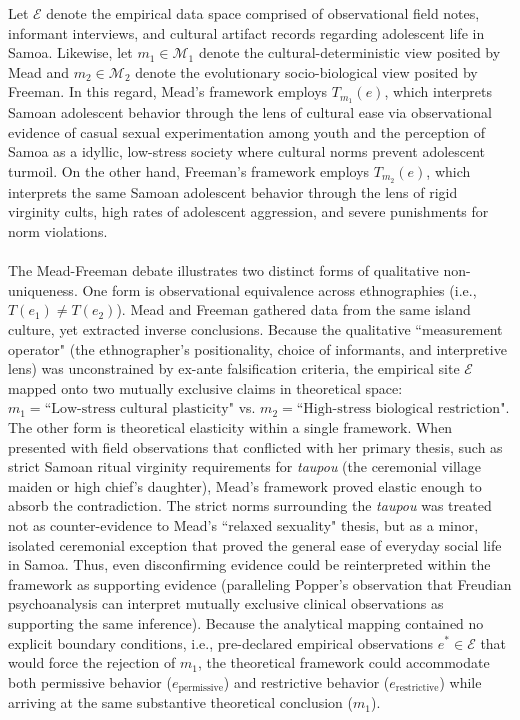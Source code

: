 \documentclass{article}
\theoremstyle{definition}
\begin{document}
Let $\mathcal{E}$ denote the empirical data space comprised of observational field notes, informant interviews, and cultural artifact records regarding adolescent life in Samoa. Likewise, let $m_1 \in \mathcal{M}_1$ denote the cultural-deterministic view posited by Mead and $m_2 \in \mathcal{M}_2$ denote the evolutionary socio-biological view posited by Freeman. In this regard, Mead's framework employs $T_{m_1}(e)$, which interprets Samoan adolescent behavior through the lens of cultural ease via observational evidence of casual sexual experimentation among youth and the perception of Samoa as a idyllic, low-stress society where cultural norms prevent adolescent turmoil. On the other hand, Freeman's framework employs $T_{m_2}(e)$, which interprets the same Samoan adolescent behavior through the lens of rigid virginity cults, high rates of adolescent aggression, and severe punishments for norm violations. \\
\\
The Mead-Freeman debate illustrates two distinct forms of qualitative non-uniqueness. One form is observational equivalence across ethnographies (i.e., $T(e_1) \neq T(e_2)$). Mead and Freeman gathered data from the same island culture, yet extracted inverse conclusions. Because the qualitative ``measurement operator" (the ethnographer's positionality, choice of informants, and interpretive lens) was unconstrained by ex-ante falsification criteria, the empirical site $\mathcal{E}$ mapped onto two mutually exclusive claims in theoretical space: $m_1 = \text{``Low-stress cultural plasticity"}$ vs. $m_2 = \text{``High-stress biological restriction"}$. The other form is theoretical elasticity within a single framework. When presented with field observations that conflicted with her primary thesis, such as strict Samoan ritual virginity requirements for \textit{taupou} (the ceremonial village maiden or high chief's daughter), Mead's framework proved elastic enough to absorb the contradiction. The strict norms surrounding the \textit{taupou} was treated not as counter-evidence to Mead's ``relaxed sexuality" thesis, but as a minor, isolated ceremonial exception that proved the general ease of everyday social life in Samoa. Thus, even disconfirming evidence could be reinterpreted within the framework as supporting evidence (paralleling Popper's observation  that Freudian psychoanalysis can interpret mutually exclusive clinical observations as supporting the same inference). Because the analytical mapping contained no explicit boundary conditions, i.e., pre-declared empirical observations $e^* \in \mathcal{E}$ that would force the rejection of $m_1$, the theoretical framework could accommodate both permissive behavior ($e_{\text{permissive}}$) and restrictive behavior ($e_{\text{restrictive}}$) while arriving at the same substantive theoretical conclusion ($m_1$).
\end{document}
